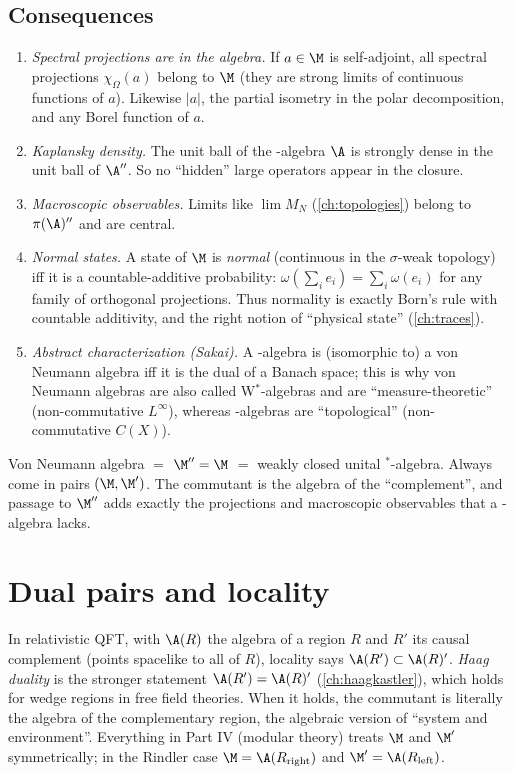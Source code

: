 \subsection*{Consequences}
\begin{enumerate}
\item \emph{Spectral projections are in the algebra.} If $a\in\M$ is self-adjoint, all spectral projections $\chi_\Omega(a)$ belong to $\M$ (they are strong limits of continuous functions of $a$). Likewise $|a|$, the partial isometry in the polar decomposition, and any Borel function of $a$.
\item \emph{Kaplansky density.} The unit ball of the \cstar-algebra $\A$ is strongly dense in the unit ball of $\A''$. So no ``hidden'' large operators appear in the closure.
\item \emph{Macroscopic observables.} Limits like $\lim M_N$ (\cref{ch:topologies}) belong to $\pi(\A)''$ and are central.
\item \emph{Normal states.} A state of $\M$ is \emph{normal} (continuous in the $\sigma$-weak topology) iff it is a countable-additive probability: $\omega(\sum_ie_i)=\sum_i\omega(e_i)$ for any family of orthogonal projections. Thus normality is exactly Born's rule with countable additivity, and the right notion of ``physical state'' (\cref{ch:traces}).
\item \emph{Abstract characterization (Sakai).} A \cstar-algebra is (isomorphic to) a von Neumann algebra iff it is the dual of a Banach space; this is why von Neumann algebras are also called W$^*$-algebras and are ``measure-theoretic'' (non-commutative $L^\infty$), whereas \cstar-algebras are ``topological'' (non-commutative $C(X)$).
\end{enumerate}

\begin{keyidea}
Von Neumann algebra $=$ $\M''=\M$ $=$ weakly closed unital $^*$-algebra. Always come in pairs $(\M,\M')$. The commutant is the algebra of the ``complement'', and passage to $\M''$ adds exactly the projections and macroscopic observables that a \cstar-algebra lacks.
\end{keyidea}

\section{Dual pairs and locality}

In relativistic QFT, with $\A(R)$ the algebra of a region $R$ and $R'$ its causal complement (points spacelike to all of $R$), locality says $\A(R')\subset\A(R)'$. \emph{Haag duality} is the stronger statement $\A(R')=\A(R)'$ (\cref{ch:haagkastler}), which holds for wedge regions in free field theories. When it holds, the commutant is literally the algebra of the complementary region, the algebraic version of ``system and environment''. Everything in Part IV (modular theory) treats $\M$ and $\M'$ symmetrically; in the Rindler case $\M=\A(R_{\rm right})$ and $\M'=\A(R_{\rm left})$.

